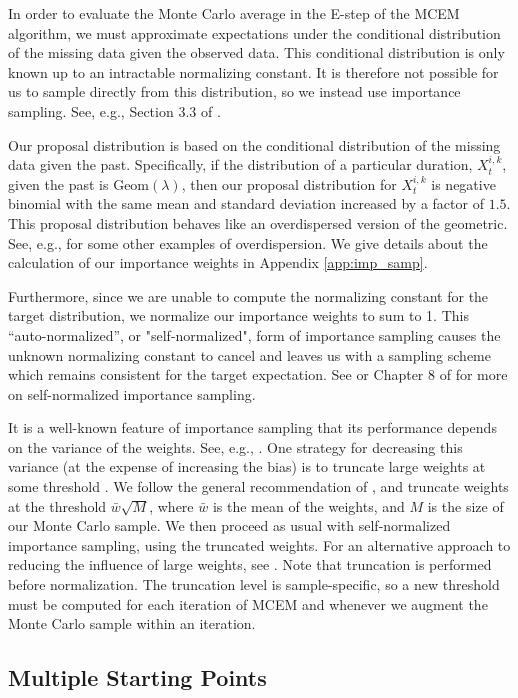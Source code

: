 \documentclass[11pt, oneside]{article}   	%
\begin{document}
In order to evaluate the Monte Carlo average in the E-step of the MCEM algorithm, we must approximate expectations under the conditional distribution of the missing data given the observed data. This conditional distribution is only known up to an intractable normalizing constant. It is therefore not possible for us to sample directly from this distribution, so we instead use importance sampling. See, e.g., Section 3.3 of \citet{Rob04}.

Our proposal distribution is based on the conditional distribution of the missing data given the past. Specifically, if the distribution of a particular duration, $X_t^{i,k}$, given the past is $\mathrm{Geom}(\lambda)$, then our proposal distribution for $X_t^{i,k}$ is negative binomial with the same mean and standard deviation increased by a factor of $1.5$. This proposal distribution behaves like an overdispersed version of the geometric. See, e.g., \citet{McC89} for some other examples of overdispersion. We give details about the calculation of our importance weights in Appendix \ref{app:imp_samp}.

Furthermore, since we are unable to compute the normalizing constant for the target distribution, we normalize our importance weights to sum to 1. This ``auto-normalized'', or "self-normalized", form of importance sampling causes the unknown normalizing constant to cancel and leaves us with a sampling scheme which remains consistent for the target expectation. See \citet{Elv22} or Chapter 8 of \citet{Cho20} for more on self-normalized importance sampling.

It is a well-known feature of importance sampling that its performance depends on the variance of the weights. See, e.g., \citet{Aga17}. One strategy for decreasing this variance (at the expense of increasing the bias) is to truncate large weights at some threshold \citep{Ion08}. We follow the general recommendation of \citeauthor{Ion08}, and truncate weights at the threshold $\bar{w} \sqrt{M}$, where $\bar{w}$ is the mean of the weights, and $M$ is the size of our Monte Carlo sample. We then proceed as usual with self-normalized importance sampling, using the truncated weights. For an alternative approach to reducing the influence of large weights, see \citet{Veh22}. Note that truncation is performed before normalization. The truncation level is sample-specific, so a new threshold must be computed for each iteration of MCEM and whenever we augment the Monte Carlo sample within an iteration.


\subsection{Multiple Starting Points}
\label{sec:mult_starts}
\end{document}
